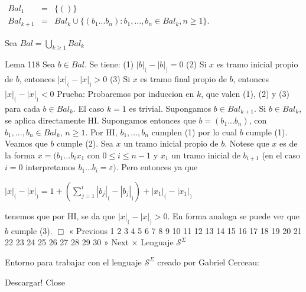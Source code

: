 \(\displaystyle \begin{array}{rcl} Bal_{1} & =& \{()\} \\ Bal_{k+1} & =& Bal_{k}\cup \{(b_{1}...b_{n}):b_{1},...,b_{n}\in Bal_{k},n\geq 1\}. \end{array} \)

Sea
\(\displaystyle Bal=\bigcup_{k\geq 1}Bal_{k} \)

Lema 118 Sea \(b\in Bal\). Se tiene:
(1) \(\left\vert b\right\vert _{(}-\left\vert b\right\vert _{)}=0\)
(2) Si \(x\) es tramo inicial propio de \(b\), entonces \(\left\vert x\right\vert _{(}-\left\vert x\right\vert _{)} >0\)
(3) Si \(x\) es tramo final propio de \(b\), entonces \(\left\vert x\right\vert _{(}-\left\vert x\right\vert _{)}< 0\)
Prueba: Probaremos por induccion en \(k\), que valen (1), (2) y (3) para cada \(b\in Bal_{k}\). El caso \(k=1\) es trivial. Supongamos \(b\in Bal_{k+1}\). Si \(b\in Bal_{k}\), se aplica directamente HI. Supongamos entonces que \( b=(b_{1}...b_{n})\), con \(b_{1},...,b_{n}\in Bal_{k}\), \(n\geq 1\). Por HI, \( b_{1},...,b_{n}\) cumplen (1) por lo cual \(b\) cumple (1). Veamos que \(b\) cumple (2). Sea \(x\) un tramo inicial propio de \(b\). Notese que \(x\) es de la forma \(x=(b_{1}...b_{i}x_{1}\) con \(0\leq i\leq n-1\) y \(x_{1}\) un tramo inicial de \(b_{i+1}\) (en el caso \(i=0\) interpretamos \(b_{1}...b_{i}= \varepsilon )\). Pero entonces ya que

\(\displaystyle \left\vert x\right\vert _{(}-\left\vert x\right\vert _{)}=1+\left( \sum_{j=1}^{i}\left\vert b_{j}\right\vert _{(}-\left\vert b_{j}\right\vert _{)}\right) +\left\vert x_{1}\right\vert _{(}-\left\vert x_{1}\right\vert _{)} \)

tenemos que por HI, se da que \(\left\vert x\right\vert _{(}-\left\vert x\right\vert _{)} >0\). En forma analoga se puede ver que \(b\) cumple (3). \(\Box\)
« Previous
1
2
3
4
5
6
7
8
9
10
11
12
13
14
15
16
17
18
19
20
21
22
23
24
25
26
27
28
29
30
» Next
×
Lenguaje \(\mathcal{S}^{\Sigma }\)

Entorno para trabajar con el lenguaje \(\mathcal{S}^{\Sigma }\) creado por Gabriel Cerceau:

Descargar!
Close
